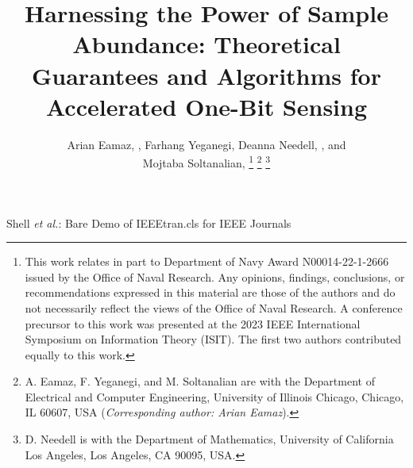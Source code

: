 \documentclass[12pt,draftcls,onecolumn]{IEEEtran}
\begin{document}
\title{Harnessing the Power of Sample Abundance: Theoretical Guarantees and Algorithms for Accelerated One-Bit Sensing}
\author{Arian Eamaz, , Farhang Yeganegi, Deanna Needell, , and \\ Mojtaba Soltanalian, 
\thanks{This work relates in part to Department of Navy Award N00014-22-1-2666 issued by the Office of Naval Research. Any opinions, findings, conclusions, or recommendations expressed in
this material are those of the authors and do not necessarily reflect the views of the
Office of Naval Research. A conference precursor to this work was presented at the 2023 IEEE International Symposium on Information Theory (ISIT). The first two authors contributed equally to this work.}
\thanks{A. Eamaz, F. Yeganegi, and M. Soltanalian are with the Department of Electrical and Computer Engineering, University of Illinois Chicago, Chicago, IL 60607, USA (\emph{Corresponding author: Arian Eamaz}).
}
\thanks{D. Needell is with the Department of Mathematics, University of California Los Angeles, Los
Angeles, CA 90095, USA.}
}

{Shell \MakeLowercase{\textit{et al.}}: Bare Demo of IEEEtran.cls for IEEE Journals}
\maketitle
\end{document}
